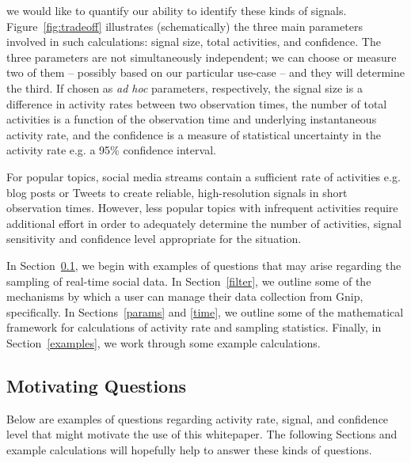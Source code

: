 \documentclass{article}
\begin{document}
we would like to quantify our ability to identify these kinds of signals. Figure~\ref{fig:tradeoff} 
illustrates (schematically) the three main parameters involved in such calculations: signal size, total 
activities, and confidence. The three parameters are not simultaneously independent; we can 
choose or measure two of them -- possibly based on our particular use-case -- and they will 
determine the third. If chosen as \emph{ad hoc} parameters, respectively, the signal 
size is a difference in activity rates between two observation times, the number of total 
activities is a function of the observation time and underlying instantaneous activity rate, and the 
confidence is a measure of statistical uncertainty in the activity rate e.g. a 95$\%$ 
confidence interval.

For popular topics, social media streams contain a sufficient rate of activities e.g. blog posts or 
Tweets to create reliable, high-resolution signals in short observation times.  
However, less popular topics with infrequent activities require additional effort in order to adequately 
determine the number of activities, signal sensitivity and confidence level appropriate for the 
situation.

In Section~\ref{Qs}, we begin with examples of questions that may arise regarding 
the sampling of real-time social data. In Section~\ref{filter}, we outline some of the mechanisms 
by which a user can manage their data collection from Gnip, specifically. In Sections~\ref{params} and 
\ref{time}, we outline some of the mathematical framework for calculations 
of activity rate and sampling statistics. Finally, in Section~\ref{examples}, we work 
through some example calculations.



\subsection{Motivating Questions} 
\label{Qs}

Below are examples of questions regarding activity rate, signal, and confidence level that might 
motivate the use of this whitepaper. The following Sections and example calculations will hopefully 
help to answer these kinds of questions.
\end{document}
